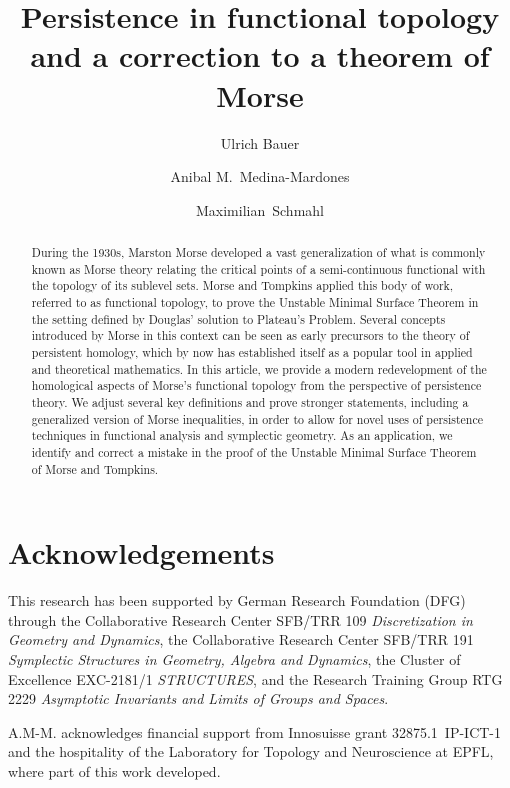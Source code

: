 \documentclass[nospthms, a4paper, final]{svjour3}
\theoremstyle{plain}
\theoremstyle{definition}
\begin{document}
\title{Persistence in functional topology and a correction to a theorem of Morse}

\author{Ulrich Bauer \and Anibal M.~Medina-Mardones \and Maximilian~Schmahl}



\maketitle

\begin{abstract}
	During the 1930s, Marston Morse developed a vast generalization of what is commonly known as Morse theory relating the critical points of a semi-continuous functional with the topology of its sublevel sets.
	Morse and Tompkins applied this body of work, referred to as functional topology, to prove the Unstable Minimal Surface Theorem in the setting defined by Douglas' solution to Plateau's Problem.
	Several concepts introduced by Morse in this context can be seen as early precursors to the theory of persistent homology, which by now has established itself as a popular tool in applied and theoretical mathematics.
	In this article, we provide a modern redevelopment of the homological aspects of Morse's functional topology from the perspective of persistence theory.
	We adjust several key definitions and prove stronger statements, including a generalized version of Morse inequalities, in order to allow for novel uses of persistence techniques in functional analysis and symplectic geometry.
	As an application, we identify and correct a mistake in the proof of the Unstable Minimal Surface Theorem of Morse and Tompkins.
\end{abstract}

\tableofcontents





\appendix


\section*{Acknowledgements}
This research has been supported by German Research Foundation (DFG) through the Collaborative Research Center SFB/TRR 109 \emph{Discretization in Geometry and Dynamics}, the Collaborative Research Center SFB/TRR 191 \emph{Symplectic Structures in Geometry, Algebra and Dynamics}, the Cluster of Excellence EXC-2181/1 \emph{STRUCTURES}, and the Research Training Group RTG 2229 \emph{Asymptotic Invariants and Limits of Groups and Spaces}.

A.M-M. acknowledges financial support from Innosuisse grant \mbox{32875.1 IP-ICT-1} and the hospitality of the Laboratory for Topology and Neuroscience at EPFL, where part of this work developed.



\end{document}

